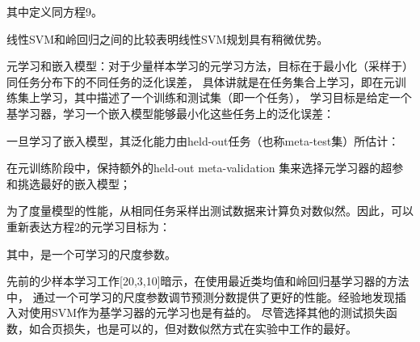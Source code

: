 其中定义同方程9。

线性SVM和岭回归之间的比较表明线性SVM规划具有稍微优势。

元学习和嵌入模型：对于少量样本学习的元学习方法，目标在于最小化（采样于）同任务分布下的不同任务的泛化误差，
具体讲就是在任务集合上学习，即在元训练集上学习，其中描述了一个训练和测试集（即一个任务），
学习目标是给定一个基学习器，学习一个嵌入模型能够最小化这些任务上的泛化误差：



一旦学习了嵌入模型，其泛化能力由held-out任务（也称meta-test集）所估计：

在元训练阶段中，保持额外的held-out meta-validation 集来选择元学习器的超参和挑选最好的嵌入模型；

为了度量模型的性能，从相同任务采样出测试数据来计算负对数似然。因此，可以重新表达方程2的元学习目标为：

其中，是一个可学习的尺度参数。

先前的少样本学习工作[20,3,10]暗示，在使用最近类均值和岭回归基学习器的方法中，
通过一个可学习的尺度参数调节预测分数提供了更好的性能。经验地发现插入对使用SVM作为基学习器的元学习也是有益的。
尽管选择其他的测试损失函数，如合页损失，也是可以的，但对数似然方式在实验中工作的最好。
